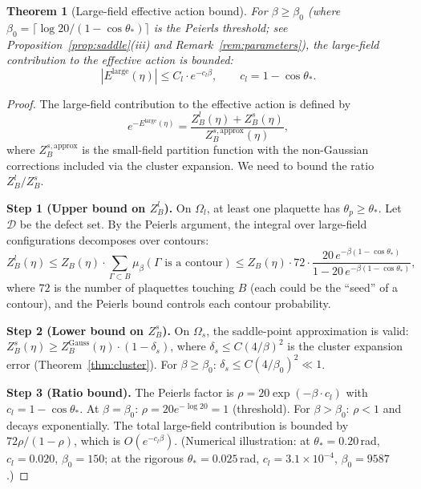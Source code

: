 \documentclass[11pt]{article}
\newtheorem{theorem}{Theorem}[section]
\theoremstyle{definition}
\begin{document}
\begin{theorem}[Large-field effective action bound]\label{thm:largefield}
For $\beta\ge\beta_0$ (where $\beta_0=\lceil\log 20/(1-\cos\theta_*)\rceil$
is the Peierls threshold; see Proposition~\ref{prop:saddle}(iii)
and Remark~\ref{rem:parameters}), the large-field contribution to the
effective action is bounded:
\begin{equation}
|E^{\mathrm{large}}(\eta)|\le C_l\cdot e^{-c_l\beta},
\qquad c_l=1-\cos\theta_*.
\end{equation}
\end{theorem}

\begin{proof}
The large-field contribution to the effective action is defined by
\begin{equation}
e^{-E^{\mathrm{large}}(\eta)}
=\frac{Z_B^l(\eta)+Z_B^s(\eta)}{Z_B^{s,\mathrm{approx}}(\eta)},
\end{equation}
where $Z_B^{s,\mathrm{approx}}$ is the small-field partition function
with the non-Gaussian corrections included via the cluster expansion.
We need to bound the ratio $Z_B^l/Z_B^s$.

\textbf{Step 1 (Upper bound on $Z_B^l$).}
On $\Omega_l$, at least one plaquette has $\theta_p\ge\theta_*$.
Let $\mathcal{D}$ be the defect set.  By the Peierls argument, the
integral over large-field configurations decomposes over contours:
\begin{equation}
Z_B^l(\eta)\le Z_B(\eta)\cdot\sum_{\Gamma\subset B}
\mu_\beta(\Gamma\text{ is a contour})
\le Z_B(\eta)\cdot 72\cdot\frac{20\,e^{-\beta(1-\cos\theta_*)}}
{1-20\,e^{-\beta(1-\cos\theta_*)}},
\end{equation}
where $72$ is the number of plaquettes touching $B$ (each could
be the ``seed'' of a contour), and the Peierls bound controls each
contour probability.

\textbf{Step 2 (Lower bound on $Z_B^s$).}
On $\Omega_s$, the saddle-point approximation is valid:
$Z_B^s(\eta)\ge Z_B^{\mathrm{Gauss}}(\eta)\cdot(1-\delta_s)$,
where $\delta_s\le C(4/\beta)^2$ is the cluster expansion error
(Theorem~\ref{thm:cluster}).  For $\beta\ge\beta_0$:
$\delta_s\le C(4/\beta_0)^2\ll 1$.

\textbf{Step 3 (Ratio bound).}
The Peierls factor is
$\rho=20\exp(-\beta\cdot c_l)$ with $c_l=1-\cos\theta_*$.
At $\beta=\beta_0$: $\rho=20e^{-\log 20}=1$ (threshold).
For $\beta>\beta_0$: $\rho<1$ and decays exponentially.
The total large-field
contribution is bounded by $72\rho/(1-\rho)$, which is $O(e^{-c_l\beta})$.
(Numerical illustration: at $\theta_*=0.20$\,rad, $c_l=0.020$,
$\beta_0=150$; at the rigorous $\theta_*=0.025$\,rad,
$c_l=3.1\times 10^{-4}$, $\beta_0=9587$.)
\end{proof}
\end{document}
